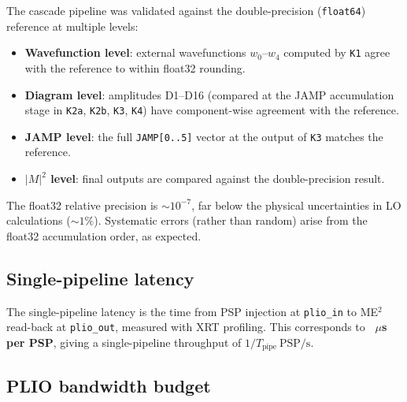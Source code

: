 The cascade pipeline was validated against the \mgfive double-precision
(\texttt{float64}) reference at multiple levels:
\begin{itemize}
  \item \textbf{Wavefunction level}: external wavefunctions $w_0$--$w_4$
    computed by \texttt{K1} agree with the \mgfive reference to within
    float32 rounding.
  \item \textbf{Diagram level}: amplitudes D1--D16 (compared at the JAMP
    accumulation stage in \texttt{K2a}, \texttt{K2b}, \texttt{K3}, \texttt{K4})
    have component-wise agreement with the reference.
  \item \textbf{JAMP level}: the full \texttt{JAMP[0..5]} vector at the output
    of \texttt{K3} matches the reference.
  \item \textbf{$|M|^2$ level}: final \ME outputs are compared against the
    \mgfive double-precision result.
\end{itemize}


The float32 relative precision is ${\sim}10^{-7}$, far below the physical
uncertainties in LO calculations (${\sim}1\%$).  Systematic errors (rather
than random) arise from the float32 accumulation order, as expected.

\subsection{Single-pipeline latency}\label{sec:res_latency}


The single-pipeline latency is the time from PSP injection at \texttt{plio\_in}
to ME$^2$ read-back at \texttt{plio\_out}, measured with XRT profiling.
This corresponds to \textbf{~$\mu$s per PSP}, giving a single-pipeline
throughput of $1/T_\text{pipe}\ \text{PSP/s}$.

\subsection{PLIO bandwidth budget}\label{sec:res_plio}

